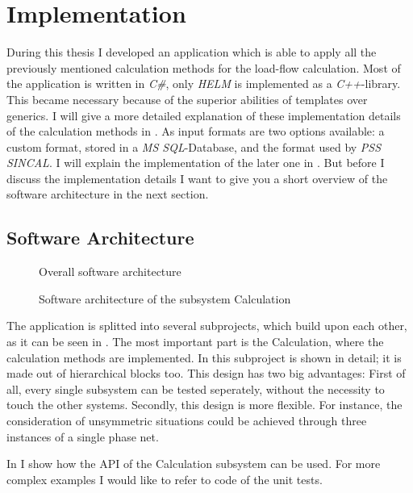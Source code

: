\chapter{Implementation}
During this thesis I developed an application which is able to apply all the previously mentioned calculation methods for the load-flow calculation. Most of the application is written in \emph{C\#}, only \emph{HELM} is implemented as a \emph{C++}-library. This became necessary because of the superior abilities of templates over generics. I will give a more detailed explanation of these implementation details of the calculation methods in .
As input formats are two options available: a custom format, stored in a \emph{MS SQL}-Database, and the format used by \emph{PSS SINCAL}. I will explain the implementation of the later one in . But before I discuss the implementation details I want to give you a short overview of the software architecture in the next section.

\section{Software Architecture}

\begin{figure}
	\centering
	
	\caption{Overall software architecture}
	\label{fig:software_architecture}
\end{figure}

\begin{figure}
	\centering
	
	\caption{Software architecture of the subsystem Calculation}
	\label{fig:calculation_architecture}
\end{figure}

The application is splitted into several subprojects, which build upon each other, as it can be seen in . The most important part is the Calculation, where the calculation methods are implemented. In  this subproject is shown in detail; it is made out of hierarchical blocks too. This design has two big advantages: First of all, every single subsystem can be tested seperately, without the necessity to touch the other systems. Secondly, this design is more flexible. For instance, the consideration of unsymmetric situations could be achieved through three instances of a single phase net.

In  I show how the API of the Calculation subsystem can be used. For more complex examples I would like to refer to code of the unit tests.

